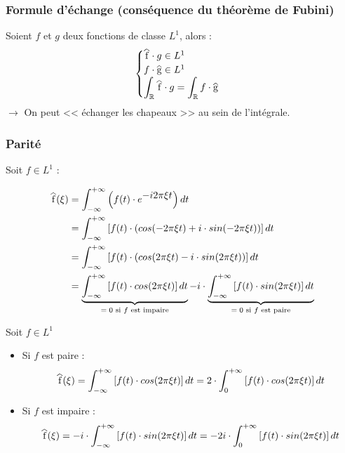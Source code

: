\documentclass[12pt, a4paper]{article}
\newcommand\reallywidehat[1]{%
\savestack{\tmpbox}{\stretchto{%
  \scaleto{%
    \scalerel*[\widthof{\ensuremath{#1}}]{\kern-.6pt\bigwedge\kern-.6pt}%
    {\rule[-\textheight/2]{1ex}{\textheight}}%
  }{\textheight}%
}{0.5ex}}%
\stackon[1pt]{#1}{\tmpbox}%
}
\begin{document}
\subsubsection{Formule d'échange (conséquence du théorème de Fubini)}

\begin{tcolorbox}
	Soient $f$ et $g$ deux fonctions de classe $L^1$, alors :
	\begin{equation*}
		\begin{cases}
			\reallywidehat{f}\cdot g \in L^1 \\
			f \cdot \reallywidehat{g} \in L^1 \\
			\displaystyle \int_{\mathbb{R}}\reallywidehat{f}\cdot g = \int_{\mathbb{R}}f\cdot\reallywidehat{g}
		\end{cases}
	\end{equation*}
	$\rightarrow$ On peut << échanger les chapeaux >> au sein de l'intégrale.
\end{tcolorbox}

\subsubsection{Parité}

Soit $f \in L^1$ :

\begin{equation*}
	\begin{aligned}
		\reallywidehat{f}(\xi) & = \int_{-\infty}^{+\infty}\left( f(t)\cdot e^{\displaystyle-i2\pi\xi t} \right)dt \\
		{} & = \int_{-\infty}^{+\infty}\left[ f(t)\cdot(cos(-2\pi\xi t) + i\cdot sin(-2\pi\xi t)) \right]dt \\
		{} & = \int_{-\infty}^{+\infty}\left[ f(t)\cdot(cos(2\pi\xi t) - i\cdot sin(2\pi\xi t)) \right]dt \\
		{} & = \underbrace{\int_{-\infty}^{+\infty}\left[ f(t)\cdot cos(2\pi\xi t)\right]dt}_{\text{$= 0$ si $f$ est impaire}} - i\cdot \underbrace{\int_{-\infty}^{+\infty}\left[ f(t)\cdot sin(2\pi\xi t) \right]dt}_{\text{$= 0$ si $f$ est paire}}
	\end{aligned}
\end{equation*}

\begin{tcolorbox}
	Soit $f \in L^1$
	\begin{itemize}
		\item Si $f$ est paire :
			\begin{equation*}
				\reallywidehat{f}(\xi) = \int_{-\infty}^{+\infty}\left[ f(t)\cdot cos(2\pi\xi t)\right]dt = 2\cdot \int_{0}^{+\infty}\left[ f(t)\cdot cos(2\pi\xi t)\right]dt
			\end{equation*}
		\item Si $f$ est impaire :
			\begin{equation*}
				\reallywidehat{f}(\xi) = -i\cdot \int_{-\infty}^{+\infty}\left[ f(t)\cdot sin(2\pi\xi t)\right]dt = -2i\cdot \int_{0}^{+\infty}\left[ f(t)\cdot sin(2\pi\xi t)\right]dt
			\end{equation*}
	\end{itemize}
\end{tcolorbox}
\end{document}
